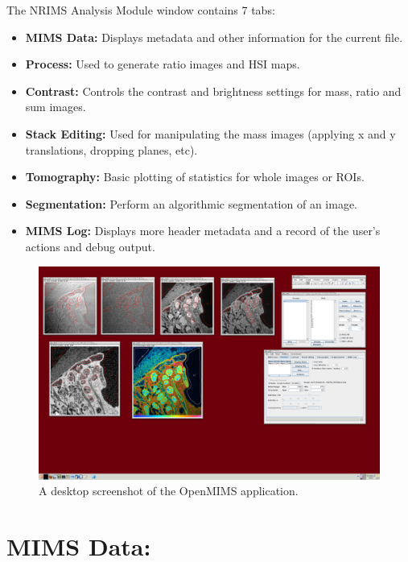 \documentclass{article}
\begin{document}
	The NRIMS Analysis Module window contains 7 tabs:
	\begin{itemize}
	\item \textbf{MIMS Data:} Displays metadata and other information for the current file.
	\item \textbf{Process:} Used to generate ratio images and HSI maps.
	\item \textbf{Contrast:} Controls the contrast and brightness settings for mass, ratio and sum images.
	\item \textbf{Stack Editing:} Used for manipulating the mass images (applying x and y translations, dropping planes, etc).
	\item \textbf{Tomography:} Basic plotting of statistics for whole images or ROIs.
	\item \textbf{Segmentation:} Perform an algorithmic segmentation of an image.
	\item \textbf{MIMS Log:} Displays more header metadata and a record of the user's actions and debug output.
	\end{itemize}
	\vfill
	\begin{figure}[ht]
	\centering
	\includegraphics[width=\textwidth]{snapshot_Desktop_3.png}
	\caption{A desktop screenshot of the OpenMIMS application.}
	\end{figure}


\newpage
\section*{MIMS Data:}
	
\end{document}
